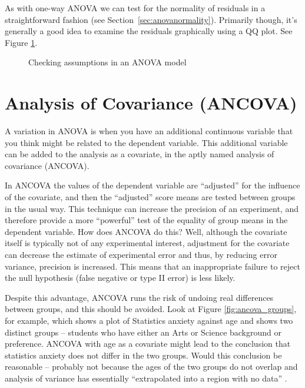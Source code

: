 As with one-way ANOVA we can test for the normality of residuals in a straightforward fashion (see Section~\ref{sec:anovanormality}). Primarily though, it's generally a good idea to examine the residuals graphically using a QQ plot. See Figure \ref{fig:factorialanova5}. 

\begin{figure}[!htb]
\begin{center}
\caption{Checking assumptions in an ANOVA model}
\label{fig:factorialanova5}
\HR
\end{center}
\end{figure}


\section{Analysis of Covariance (ANCOVA)\label{sec:ancova}}

A variation in ANOVA is when you have an additional continuous variable that you think might be related to the dependent variable. This additional variable can be added to the analysis as a covariate, in the aptly named analysis of covariance (ANCOVA).

In ANCOVA the values of the dependent variable are “adjusted” for the influence of the covariate, and then the “adjusted” score means are tested between groups in the usual way. This technique can increase the precision of an experiment, and therefore provide a more “powerful” test of the equality of group means in the dependent variable. How does ANCOVA do this? Well, although the covariate itself is typically not of any experimental interest, adjustment for the covariate can decrease the estimate of experimental error and thus, by reducing error variance, precision is increased. This means that an inappropriate failure to reject the null hypothesis (false negative or type II error) is less likely. 

Despite this advantage, ANCOVA runs the risk of undoing real differences between groups, and this should be avoided. Look at Figure \ref{fig:ancova_groups}, for example, which shows a plot of Statistics anxiety against age and shows two distinct groups – students who have either an Arts or Science background or preference. ANCOVA with age as a covariate might lead to the conclusion that statistics anxiety does not differ in the two groups. Would this conclusion be reasonable – probably not because the ages of the two groups do not overlap and analysis of variance has essentially “extrapolated into a region with no data” \parencite[68]{Everitt1996}. 

